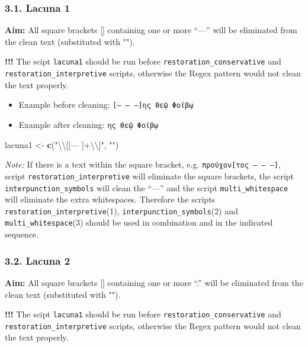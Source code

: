 \documentclass[]{article}
\newenvironment{Shaded}{\begin{snugshade}}{\end{snugshade}}
\newcommand{\CharTok}[1]{\textcolor[rgb]{0.31,0.60,0.02}{#1}}
\newcommand{\KeywordTok}[1]{\textcolor[rgb]{0.13,0.29,0.53}{\textbf{#1}}}
\newcommand{\NormalTok}[1]{#1}
\newcommand{\StringTok}[1]{\textcolor[rgb]{0.31,0.60,0.02}{#1}}
\providecommand{\tightlist}{%
  \setlength{\itemsep}{0pt}\setlength{\parskip}{0pt}}
\begin{document}
\hypertarget{lacuna-1}{%
\subsubsection{3.1. Lacuna 1}\label{lacuna-1}}

\textbf{Aim:} All square brackets {[}{]} containing one or more ``---''
will be eliminated from the clean text (substituted with "").

\textbf{!!!} The scipt \texttt{lacuna1} should be run before
\texttt{restoration\_conservative} and
\texttt{restoration\_interpretive} scripts, otherwise the Regex pattern
would not clean the text properly.

\begin{itemize}
\tightlist
\item
  Example before cleaning: \texttt{{[}—\ —\ —{]}ης\ θεῷ\ Φοίβῳ}
\item
  Example after cleaning: \texttt{ης\ θεῷ\ Φοίβῳ}
\end{itemize}

\begin{Shaded}
\begin{Highlighting}[]
\NormalTok{lacuna1 <-}\StringTok{ }\KeywordTok{c}\NormalTok{(}\StringTok{"}\CharTok{\textbackslash{}\textbackslash{}}\StringTok{[[— ]+}\CharTok{\textbackslash{}\textbackslash{}}\StringTok{]"}\NormalTok{, }\StringTok{""}\NormalTok{)}
\end{Highlighting}
\end{Shaded}

\emph{Note:} If there is a text within the square bracket, e.g.
\texttt{προύχον{[}τος\ —\ —\ —{]}}, script
\texttt{restoration\_interpretive} will eliminate the square brackets,
the script \texttt{interpunction\_symbols} will clean the ``---'' and
the script \texttt{multi\_whitespace} will eliminate the extra
whitespaces. Therefore the scripts
\texttt{restoration\_interpretive}(1),
\texttt{interpunction\_symbols}(2) and \texttt{multi\_whitespace}(3)
should be used in combination and in the indicated sequence.

\hypertarget{lacuna-2}{%
\subsubsection{3.2. Lacuna 2}\label{lacuna-2}}

\textbf{Aim:} All square brackets {[}{]} containing one or more ``.''
will be eliminated from the clean text (substituted with "").

\textbf{!!!} The scipt \texttt{lacuna1} should be run before
\texttt{restoration\_conservative} and
\texttt{restoration\_interpretive} scripts, otherwise the Regex pattern
would not clean the text properly.
\end{document}
